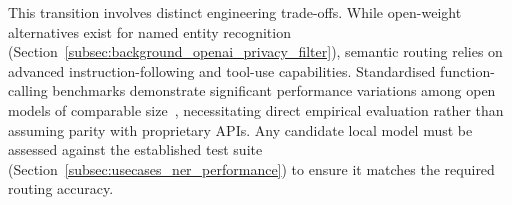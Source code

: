 This transition involves distinct engineering trade-offs. While open-weight alternatives exist for named entity recognition (Section~\ref{subsec:background_openai_privacy_filter}), semantic routing relies on advanced instruction-following and tool-use capabilities. Standardised function-calling benchmarks demonstrate significant performance variations among open models of comparable size~\cite{patil2025bfcl}, necessitating direct empirical evaluation rather than assuming parity with proprietary APIs. Any candidate local model must be assessed against the established test suite (Section~\ref{subsec:usecases_ner_performance}) to ensure it matches the required routing accuracy.